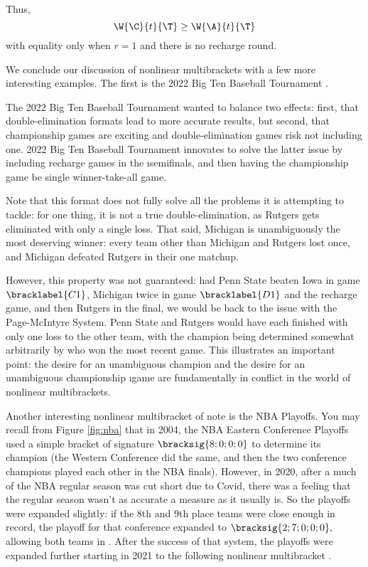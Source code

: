 {{        Thus, $$\W{\C}{t}{\T} \geq \W{\A}{t}{\T}$$ with equality only when $r=1$ and there is no recharge round.
    }{}{\fried}

    We conclude our discussion of nonlinear multibrackets with a few more interesting examples. The first is the 2022 Big Ten Baseball Tournament \cite{wiki_bigten}.


    The 2022 Big Ten Baseball Tournament wanted to balance two effects: first, that double-elimination formats lead to more accurate results, but second, that championship games are exciting and double-elimination games risk not including one. 2022 Big Ten Baseball Tournament innovates to solve the latter issue by including recharge games in the \i{semifinals}, and then having the championship game be single winner-take-all game.

    Note that this format does not fully solve all the problems it is attempting to tackle: for one thing, it is not a true double-elimination, as Rutgers gets eliminated with only a single loss. That said, Michigan is unambiguously the most deserving winner: every team other than Michigan and Rutgers lost once, and Michigan defeated Rutgers in their one matchup.
    
    However, this property was not guaranteed: had Penn State beaten Iowa in game $\bracklabel{C1}$, Michigan twice in game $\bracklabel{D1}$ and the recharge game, and then Rutgers in the final, we would be back to the issue with the Page-McIntyre System. Penn State and Rutgers would have each finished with only one loss to the other team, with the champion being determined somewhat arbitrarily by who won the most recent game. This illustrates an important point: the desire for an unambiguous champion and the desire for an unambiguous championship \i{game} are fundamentally in conflict in the world of nonlinear multibrackets.

    Another interesting nonlinear multibracket of note is the NBA Playoffs. You may recall from Figure \ref{fig:nba} that in 2004, the NBA Eastern Conference Playoffs used a simple bracket of signature $\bracksig{8;0;0;0}$ to determine its champion (the Western Conference did the same, and then the two conference champions played each other in the NBA finals). However, in 2020, after a much of the NBA regular season was cut short due to Covid, there was a feeling that the regular season wasn't as accurate a measure as it usually is. So the playoffs were expanded slightly: if the 8th and 9th place teams were close enough in record, the playoff for that conference expanded to $\bracksig{2;7;0;0;0},$ allowing both teams in \cite{wiki_nba1}. After the success of that system, the playoffs were expanded further starting in 2021 to the following nonlinear multibracket \cite{wiki_nba2}.
    
}
